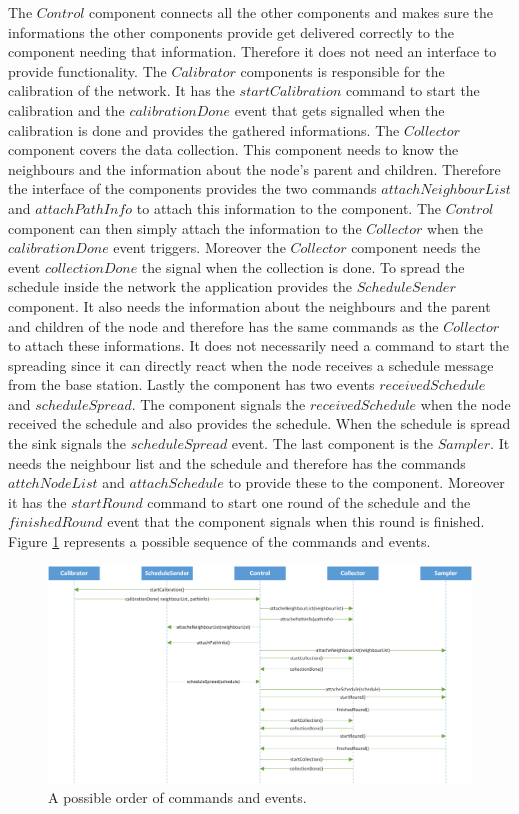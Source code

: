The $Control$ component connects all the other components and makes sure the informations the other components provide get delivered correctly to the component needing that information. Therefore it does not need an interface to provide functionality.     
The $Calibrator$ components is responsible for the calibration of the network. It has the $startCalibration$ command to start the calibration and the $calibrationDone$ event that gets signalled when the calibration is done and provides the gathered informations. The $Collector$ component covers the data collection. This component needs to know the neighbours and the information about the node's parent and children. Therefore the interface of the components provides the two commands $attachNeighbourList$ and $attachPathInfo$ to attach this information to the component. The $Control$ component can then simply attach the information to the $Collector$ when the $calibrationDone$ event triggers. Moreover the $Collector$ component needs the event $collectionDone$ the signal when the collection is done. To spread the schedule inside the network the application provides the $ScheduleSender$ component. It also needs the information about the neighbours and the parent and children of the node and therefore has the same commands as the $Collector$ to attach these informations. It does not necessarily need a command to start the spreading since it can directly react when the node receives a schedule message from the base station. Lastly the component has two events $receivedSchedule$ and $scheduleSpread$. The component signals the $receivedSchedule$ when the node received the schedule and also provides the schedule. When the schedule is spread the sink signals the $scheduleSpread$ event. The last component is the $Sampler$. It needs the neighbour list and the schedule and therefore has the commands $attchNodeList$ and $attachSchedule$ to provide these to the component. Moreover it has the $startRound$ command to start one round of the schedule and the $finishedRound$ event that the component signals when this round is finished. Figure \ref{fig:commandEvents} represents a possible sequence of the commands and events.

\begin{figure}[btp]
	\centering
    \includegraphics[scale=0.55]{content/images/Processes/ComandsEvents}
   	\caption{A possible order of commands and events.}
    \label{fig:commandEvents}
\end{figure}

